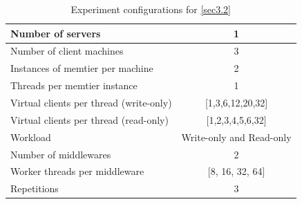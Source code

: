 \documentclass[11pt,a4paper]{article}
\begin{document}
\begin{table}[H]
    \centering
	\begin{tabular}{|l|c|}
		\hline Number of servers                & 1                        \\ 
		\hline Number of client machines        & 3                        \\ 
		\hline Instances of memtier per machine & 2                        \\ 
		\hline Threads per memtier instance     & 1                        \\
		\hline Virtual clients per thread (write-only)  & [1,3,6,12,20,32] \\ 
		\hline Virtual clients per thread (read-only)   & [1,2,3,4,5,6,32] \\ 
		\hline Workload                         & Write-only and Read-only \\
		\hline Number of middlewares            & 2                        \\
		\hline Worker threads per middleware    & [8, 16, 32, 64]          \\
		\hline Repetitions                      & 3                        \\ 
		\hline 
	\end{tabular}
	\caption{Experiment configurations for \autoref{sec3.2}} \label{exp3-2}
\end{table}
\end{document}
